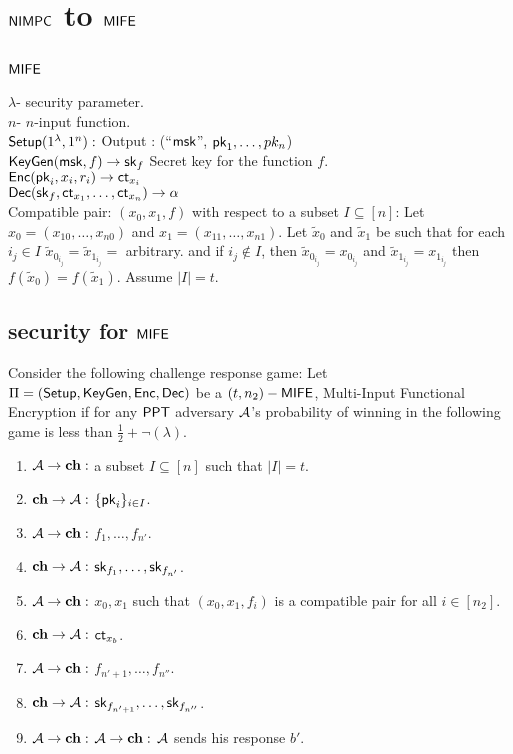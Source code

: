 \section{$\mathsf{NIMPC}$ to $\mathsf{MIFE}$}
\subsection{$\mathsf{MIFE}$}
$\lambda$- security parameter.\\
$n$- $n$-input function.\\
$\mathsf{Setup}(1^{\lambda},1^n):$ Output : (``$\mathsf{msk}$'', $\mathsf{pk}_1, \ldots ,pk_n$)\\
$\mathsf{KeyGen}(\mathsf{msk}, f) \rightarrow \mathsf{sk}_f$ Secret key for the function $f$.\\
$\mathsf{Enc}(\mathsf{pk}_i, x_i, r_i)\rightarrow \mathsf{ct}_{x_i}$\\
$\mathsf{Dec}(\mathsf{sk}_f,\mathsf{ct}_{x_1},\ldots, \mathsf{ct}_{x_n})\rightarrow \alpha$\\ 
Compatible pair: $(x_0,x_1,f)$ with respect to a subset $I\subseteq [n]$: Let $x_0=(x_{10},\ldots, x_{n0})$ and $x_1=(x_{11},\ldots, x_{n1})$. Let $\tilde{x}_0$ and $\tilde{x}_1$ be such that for each $i_j\in I$ $\tilde{x}_{0_{i_j}}=\tilde{x}_{1_{i_j}}=$ arbitrary. and if $i_j\notin I$, then $\tilde{x}_{0_{i_j}}=x_{0_{i_j}}$ and $\tilde{x}_{1_{i_j}}=x_{1_{i_j}}$ then $f(\tilde{x}_0)=f(\tilde{x}_1)$. Assume $|I|=t$.

\subsection{security for $\mathsf{MIFE}$}
Consider the following challenge response game: Let $\Pi=(\mathsf{Setup}, \mathsf{KeyGen}, \mathsf{Enc}, \mathsf{Dec})$ be a $(t,n_2)-\mathsf{MIFE}$, Multi-Input Functional Encryption if for any $\mathsf{PPT}$ adversary $\mathcal{A}$'s probability of winning in the following game is less than $\frac{1}{2}+ \neg(\lambda)$.
\begin{enumerate}
	\item $\mathcal{A} \rightarrow \mathbf{ch}:$ a subset $I\subseteq[n]$ such that $|I|= t$.
	\item $\mathbf{ch} \rightarrow \mathcal{A}:$ $\{\mathsf{pk}_i\}_{i\in I}$.
	\item $\mathcal{A} \rightarrow \mathbf{ch}:$ $f_1,\ldots,f_{n'}$.
	\item $\mathbf{ch} \rightarrow \mathcal{A}:$ $\mathsf{sk}_{f_1},\ldots, \mathsf{sk}_{f_{n'}}$.
	\item $\mathcal{A} \rightarrow \mathbf{ch}:$ $x_0, x_1$ such that $(x_0,x_1,f_i)$ is a compatible pair for all $i\in[n_2]$.
	\item $\mathbf{ch} \rightarrow \mathcal{A}:$ $\mathsf{ct}_{x_b}$.
	\item $\mathcal{A} \rightarrow \mathbf{ch}:$ $f_{n'+1},\ldots,f_{n''}$.
	\item $\mathbf{ch} \rightarrow \mathcal{A}:$ $\mathsf{sk}_{f_{n'+1}},\ldots, \mathsf{sk}_{f_{n''}}$.
	\item $\mathcal{A} \rightarrow \mathbf{ch}:$ $\mathcal{A} \rightarrow \mathbf{ch}:$ $\mathcal{A}$ sends his response $b'$.
\end{enumerate}

